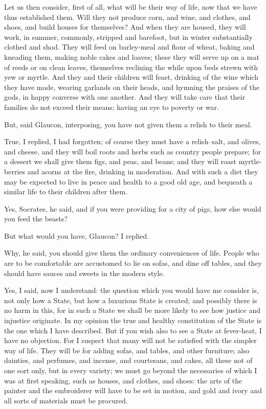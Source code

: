 Let us then consider, first of all, what will be their way of life,
now that we have thus established them. Will they not produce corn, and
wine, and clothes, and shoes, and build houses for themselves? And
when they are housed, they will work, in summer, commonly, stripped and
barefoot, but in winter substantially clothed and shod. They will feed
on barley-meal and flour of wheat, baking and kneading them, making
noble cakes and loaves; these they will serve up on a mat of reeds or on
clean leaves, themselves reclining the while upon beds strewn with yew
or myrtle. And they and their children will feast, drinking of the wine
which they have made, wearing garlands on their heads, and hymning the
praises of the gods, in happy converse with one another. And they will
take care that their families do not exceed their means; having an eye
to poverty or war.

But, said Glaucon, interposing, you have not given them a relish to
their meal.

True, I replied, I had forgotten; of course they must have a
relish--salt, and olives, and cheese, and they will boil roots and herbs
such as country people prepare; for a dessert we shall give them figs,
and peas, and beans; and they will roast myrtle-berries and acorns
at the fire, drinking in moderation. And with such a diet they may be
expected to live in peace and health to a good old age, and bequeath a
similar life to their children after them.

Yes, Socrates, he said, and if you were providing for a city of pigs,
how else would you feed the beasts?

But what would you have, Glaucon? I replied.

Why, he said, you should give them the ordinary conveniences of life.
People who are to be comfortable are accustomed to lie on sofas, and
dine off tables, and they should have sauces and sweets in the modern
style.

Yes, I said, now I understand: the question which you would have me
consider is, not only how a State, but how a luxurious State is created;
and possibly there is no harm in this, for in such a State we shall be
more likely to see how justice and injustice originate. In my opinion
the true and healthy constitution of the State is the one which I have
described. But if you wish also to see a State at fever-heat, I have
no objection. For I suspect that many will not be satisfied with the
simpler way of life. They will be for adding sofas, and tables,
and other furniture; also dainties, and perfumes, and incense, and
courtesans, and cakes, all these not of one sort only, but in every
variety; we must go beyond the necessaries of which I was at first
speaking, such as houses, and clothes, and shoes: the arts of the
painter and the embroiderer will have to be set in motion, and gold and
ivory and all sorts of materials must be procured.

